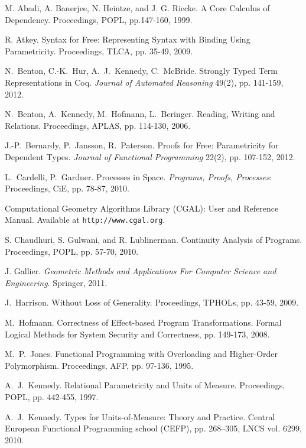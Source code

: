 \documentclass{sigplanconf}
\theoremstyle{examplestyle}
\theoremstyle{restatementstyle}
\begin{document}
\begin{thebibliography}{12}
\softraggedright

M. Abadi, A. Banerjee, N. Heintze, and J. G. Riecke. A Core Calculus
of Dependency. Proceedings, POPL, pp.147-160, 1999.

R. Atkey.  Syntax for Free: Representing Syntax with Binding Using
Parametricity.  Proceedings, TLCA,
pp. 35-49, 2009.

N.~Benton, C.-K.~Hur, A.~J.~Kennedy, C.~McBride.
Strongly Typed Term Representations in {Coq}.
{\em Journal of Automated Reasoning} 49(2), pp. 141-159, 2012.

N.~Benton, A.~Kennedy, M.~Hofmann, L.~Beringer.
Reading, Writing and Relations.
Proceedings, APLAS,
pp. 114-130, 2006.

J.-P.~Bernardy, P.~Jansson, R.~Paterson.
Proofs for Free: Parametricity for Dependent Types.
{\em Journal of Functional Programming} 22(2), pp. 107-152, 2012.

L.~Cardelli, P.~Gardner.
Processes in Space.
{\em Programs, Proofs, Processes}: Proceedings, CiE, pp. 78-87, 
2010.

Computational Geometry Algorithms Library (CGAL): User and Reference
Manual.  Available at {\tt http://www.cgal.org}.

S. Chaudhuri, S. Gulwani, and R. Lublinerman.  Continuity Analysis of
Programs.  Proceedings, POPL, pp. 57-70, 2010.

J. Gallier. {\em Geometric Methods and Applications For Computer
Science and Engineering}. Springer, 2011.

J.~Harrison.
Without Loss of Generality.
Proceedings, TPHOLs,
pp. 43-59, 2009.

M.~Hofmann. Correctness of Effect-based Program
Transformations. Formal Logical Methods for System Security and
Correctness, pp. 149-173, 2008.

M.~P.~Jones.  Functional Programming with Overloading and Higher-Order
Polymorphism. Proceedings, AFP,
pp. 97-136, 1995.

A.~J.~Kennedy. Relational Parametricity and Units of Measure.
Proceedings, POPL, pp. 442-455, 1997.

A.~J.~Kennedy. Types for Units-of-Measure: Theory and Practice.
Central European Functional Programming school (CEFP), pp. 268--305, LNCS vol. 6299, 2010. 


\end{thebibliography}
\end{document}
